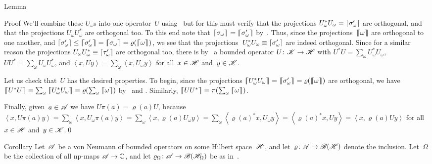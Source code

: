 \documentclass[a]{subfiles}
\begin{document}
\begin{parsec}
\begin{point}{Lemma}
\begin{point}{Proof}
We'll combine these $U_\omega$s into one operator~$U$
using~ but for this must
verify that the projections $U_\omega^* U_\omega=\left\lceil\sigma_\omega'\right\rceil$
are orthogonal,
and that the projections $U_\omega U_\omega^*$
are orthogonal too.
To this end note that
$\cceil{\sigma_\omega}=\cceil{\sigma_\omega'}$
by~.
Thus, since the projections~$\left\lceil\!\!\left\lceil\omega\right\rceil\!\!\right\rceil$
are orthogonal to one another,
and $\ceil{\sigma_\omega'}\leq \cceil{\sigma_\omega'}
= \cceil{\sigma_\omega} =\varrho(\cceil{\omega})$,
we see that the projections~$U^*_\omega U_\omega \equiv 
\left\lceil\sigma_\omega'\right\rceil$
are indeed orthogonal.
Since for a similar reason
the projections $U_\omega U_\omega^*
\equiv \left\lceil\tau_\omega'\right\rceil$ are orthogonal too,
there is by~
a bounded operator $U\colon \mathscr{K}\to\mathscr{H}$
with 
$U^*U = \sum_\omega U_\omega^* U_\omega$,
$UU^* = \sum_\omega U_\omega U_\omega^*$,
and $\left<x,Uy\right>=\sum_\omega \left<x,U_\omega y\right>$
for all~$x\in\mathscr{H}$ and~$y\in \mathscr{K}$.

Let us check that~$U$ has the desired properties.
To begin, since the projections
$\cceil{U_\omega^*U_\omega}=\cceil{\sigma_\omega'}=\varrho(\cceil{\omega})$
are orthogonal,
we have $\cceil{U^*U}=\sum_\omega \cceil{U_\omega^* U_\omega}
=  \varrho(\sum_\omega \cceil{\omega})$
by~ and .
Similarly, $\cceil{UU^*}= \pi(\sum_\omega \cceil{\omega})$.

Finally,
given~$a\in\mathscr{A}$
we have $U\pi(a)=\varrho(a)U$,
because $\left<x,U\pi(a)y\right>
= \sum_\omega \left<x,U_\omega \pi(a)y\right>
= \sum_\omega \left<x,\varrho(a) U_\omega y\right>
= \sum_\omega \left<\varrho(a)^* x, U_\omega y\right>
= \left<\varrho(a)^* x, U y\right>
= \left<x, \varrho(a) U y\right>$
for all~$x\in\mathscr{H}$ and~$y\in\mathscr{K}$.\qed
\end{point}
\end{point}
\begin{point}{Corollary}%
Let~$\mathscr{A}$ be a von Neumann 
of bounded operators on some Hilbert space~$\mathscr{H}$,
and let~$\varrho\colon \mathscr{A}\to\mathscr{B}(\mathscr{H})$
denote the inclusion.
Let~$\Omega$ be the collection of all np-maps $\mathscr{A}\to\mathbb{C}$,
and let $\varrho_\Omega\colon \mathscr{A}\to\mathscr{B}(\mathscr{H}_\Omega)$
be as in~\TODO{}.


\end{point}
\end{parsec}
\end{document}
